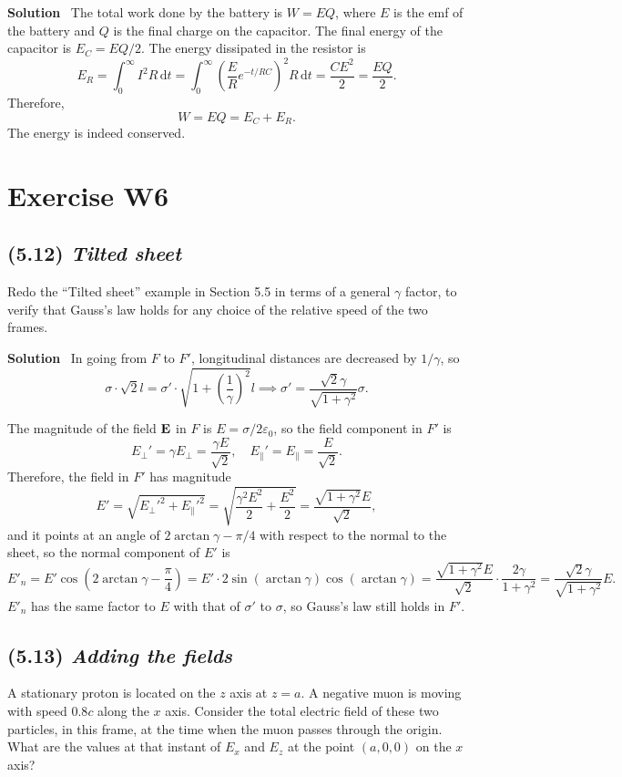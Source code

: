 \documentclass[hidelinks]{article}
\begin{document}
\vspace{5mm}
\noindent
\textbf{Solution} \, The total work done by the battery is $W=EQ$, where $E$ is the emf of the battery and $Q$ is the final charge on the capacitor. The final energy of the capacitor is $E_C = EQ/2$. The energy dissipated in the resistor is
$$E_R = \int_0^\infty I^2R \, \mathrm{d}t = \int_0^\infty (\frac{E}{R}e^{-t/RC})^2R \, \mathrm{d}t = \frac{CE^2}{2} = \frac{EQ}{2}.$$
Therefore,
$$W = EQ = E_C + E_R.$$
The energy is indeed conserved.

\pagebreak

\section{Exercise W6}
\subsection{(5.12) \textit{Tilted sheet}}
Redo the “Tilted sheet” example in Section 5.5 in terms of a general $\gamma$ factor, to verify that Gauss’s law holds for any choice of the relative speed of the two frames.

\vspace{5mm}
\noindent
\textbf{Solution} \, In going from $F$ to $F'$, longitudinal distances are decreased by $1/ \gamma$, so
$$\sigma \cdot \sqrt{2}l = \sigma' \cdot \sqrt{1+\left( \frac{1}{\gamma}\right)^2} l \implies \sigma' = \frac{\sqrt{2}\gamma}{\sqrt{1+\gamma^2}}\sigma.$$

The magnitude of the field $\vb{E}$ in $F$ is $E= \sigma/2\varepsilon_0$, so the field component in $F'$ is
$$E_\perp' = \gamma E_\perp = \frac{\gamma E}{\sqrt{2}}, \quad E_\parallel' = E_\parallel = \frac{E}{\sqrt{2}}. $$
Therefore, the field in $F'$ has magnitude
$$E' = \sqrt{E_\perp'^2+E_\parallel'^2} = \sqrt{\frac{\gamma^2E^2}{2}+\frac{E^2}{2}} = \frac{\sqrt{1+\gamma^2}E}{\sqrt{2}},$$
and it points at an angle of $2\arctan \gamma-\pi/4$ with respect to the normal to
the sheet, so the normal component of $E'$ is
$$E'_n = E' \cos (2\arctan \gamma - \frac{\pi}{4}) = E' \cdot 2\sin (\arctan \gamma) \cos (\arctan \gamma) = \frac{\sqrt{1+\gamma^2}E}{\sqrt{2}} \cdot \frac{2\gamma}{1+\gamma^2} = \frac{\sqrt{2} \gamma}{\sqrt{1+\gamma^2}}E.$$
$E'_n$ has the same factor to $E$ with that of $\sigma'$ to $\sigma$, so Gauss's law still holds in $F'$. 

\subsection{(5.13) \textit{Adding the fields}}
A stationary proton is located on the $z$ axis at $z = a$. A negative muon is moving with speed $0.8c$ along the $x$ axis. Consider the total electric field of these two particles, in this frame, at the time when the muon passes through the origin. What are the values at that instant of $E_x$ and $E_z$ at the point $(a, 0, 0)$ on the $x$ axis?
\end{document}
